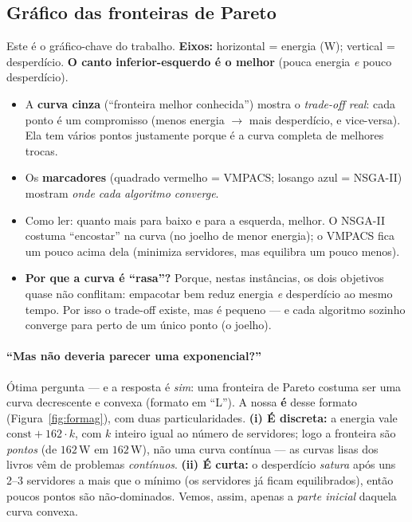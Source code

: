 \documentclass[11pt]{article}
\begin{document}
\subsection{Gráfico das fronteiras de Pareto}
\begin{ideia}
Este é o gráfico-chave do trabalho. \textbf{Eixos:} horizontal = energia (W);
vertical = desperdício. \textbf{O canto inferior-esquerdo é o melhor} (pouca
energia \emph{e} pouco desperdício).
\end{ideia}
\begin{itemize}[leftmargin=1.4em,itemsep=2pt]
  \item A \textbf{curva cinza} (``fronteira melhor conhecida'') mostra o
  \emph{trade-off real}: cada ponto é um compromisso (menos energia $\to$ mais
  desperdício, e vice-versa). Ela tem vários pontos justamente porque é a curva
  completa de melhores trocas.
  \item Os \textbf{marcadores} (quadrado vermelho = VMPACS; losango azul =
  NSGA-II) mostram \emph{onde cada algoritmo converge}.
  \item Como ler: quanto mais para baixo e para a esquerda, melhor. O NSGA-II
  costuma ``encostar'' na curva (no joelho de menor energia); o VMPACS fica um
  pouco acima dela (minimiza servidores, mas equilibra um pouco menos).
  \item \textbf{Por que a curva é ``rasa''?} Porque, nestas instâncias, os dois
  objetivos quase não conflitam: empacotar bem reduz energia \emph{e} desperdício
  ao mesmo tempo. Por isso o trade-off existe, mas é pequeno — e cada algoritmo
  sozinho converge para perto de um único ponto (o joelho).
\end{itemize}

\paragraph{``Mas não deveria parecer uma exponencial?''} Ótima pergunta --- e a resposta é \emph{sim}: uma fronteira de Pareto costuma ser uma curva decrescente e convexa (formato em ``L''). A nossa \textbf{é} desse formato (Figura~\ref{fig:formag}), com duas particularidades. \textbf{(i) É discreta:} a energia vale $\text{const}+162\cdot k$, com $k$ inteiro igual ao número de servidores; logo a fronteira são \emph{pontos} (de $162$\,W em $162$\,W), não uma curva contínua --- as curvas lisas dos livros vêm de problemas \emph{contínuos}. \textbf{(ii) É curta:} o desperdício \emph{satura} após uns 2--3 servidores a mais que o mínimo (os servidores já ficam equilibrados), então poucos pontos são não-dominados. Vemos, assim, apenas a \emph{parte inicial} daquela curva convexa.
\end{document}
